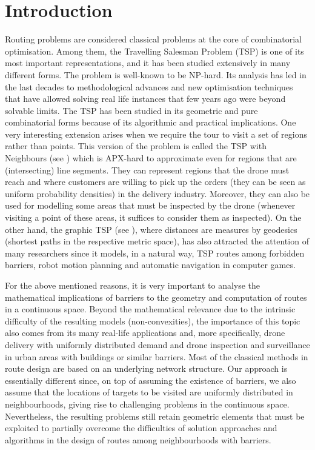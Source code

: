 \documentclass[a4paper,  review, authoryear, 1p.]{elsarticle}
\newcommand{\JP}[1]{{\color{armygreen}#1}}
\begin{document}
	\section{Introduction}
	Routing problems are considered classical problems at the core of combinatorial optimisation. Among them, the Travelling Salesman Problem (TSP) is one of its most important representations, and it has been studied extensively in many different forms. The problem is \JP{well-known} to be NP-hard. Its analysis has led in the last decades to methodological advances and new optimisation techniques that have allowed solving real life instances that few years ago were beyond solvable limits. The TSP has been studied in its geometric and pure combinatorial forms because of its algorithmic and practical implications. One very interesting extension arises when we require the tour to visit a set of regions rather than points. This version of the problem is called the TSP with Neighbours (see  \citet{arkin1994a}) which is APX-hard to approximate even for regions that are (intersecting) line segments.  They can represent regions that the drone must reach and where customers are willing to pick up the orders (they can be seen as uniform probability densities) in the delivery industry. Moreover, they can also be used for modelling some areas that must be inspected by the drone (whenever visiting a point of these areas, it suffices to consider them as inspected).  On the other hand, the graphic TSP (see \citet{t.moemke22}), where distances are measures by geodesics (shortest paths in the respective metric space), has also attracted the attention of many researchers since it models, in a natural way, TSP routes among forbidden barriers, robot motion planning and automatic navigation in computer games. 
	
	For the above mentioned reasons, it is very important to analyse the mathematical implications of barriers to the geometry and computation of routes in a continuous space. Beyond the mathematical relevance due to the intrinsic difficulty of the resulting models (non-convexities), the importance of this topic also comes from its many real-life applications and, more specifically, drone delivery with uniformly distributed demand and drone inspection and surveillance in urban areas with buildings or similar barriers.  Most of the classical methods in route design are based on an underlying network structure. Our approach is essentially different since, on top of assuming the existence of barriers, we also assume that the locations of targets to be visited are uniformly distributed in neighbourhoods, giving rise to challenging problems in the continuous space. Nevertheless, the resulting problems still retain geometric elements that must be exploited to partially overcome the difficulties of solution approaches and algorithms in the design of routes among neighbourhoods with barriers.
	
\end{document}
